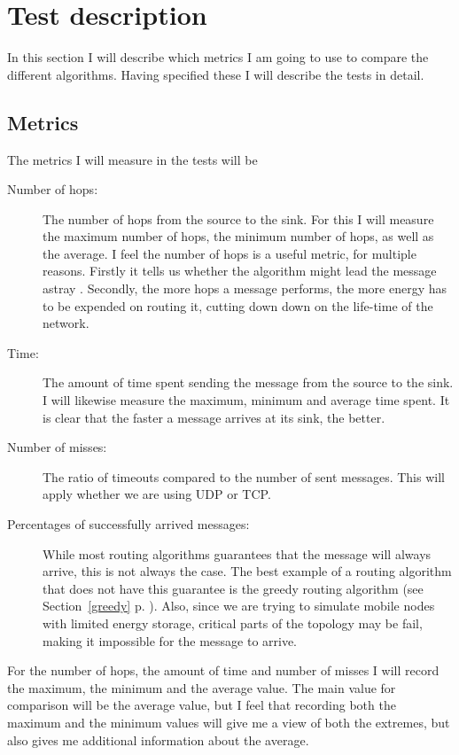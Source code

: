 \section{Test description}
In this section I will describe which metrics I am going to use to compare the different algorithms. Having specified these I will describe the tests in detail.

\subsection{Metrics}

The metrics I will measure in the tests will be 
\begin{description}
\item[Number of hops:] The number of hops from the source to the sink. For this I will measure the maximum number of hops, the minimum number of hops, as well as the average. I feel the number of hops is a useful metric, for multiple reasons. Firstly it tells us whether the algorithm might lead the message astray  . Secondly, the more hops a message performs, the more energy has to be expended on routing it, cutting down down on the life-time of the network.

\item[Time:] The amount of time spent sending the message from the source to the sink. I will likewise measure the maximum, minimum and average time spent. It is clear that the faster a message arrives at its sink, the better.

\item[Number of misses:] The ratio of timeouts compared to the number of sent messages. This will apply whether we are using UDP or TCP. 

\item[Percentages of successfully arrived messages:] While most routing algorithms guarantees that the message will always arrive, this is not always the case. The best example of a routing algorithm that does not have this guarantee is the greedy routing algorithm (see Section~\ref{greedy} p. \pageref{greedy}). Also, since we are trying to simulate mobile nodes with limited energy storage, critical parts of the topology may be fail, making it impossible for the message to arrive.
\end{description}

For the number of hops, the amount of time and number of misses I will record the maximum, the minimum and the average value. The main value for comparison will be the average value, but I feel that recording both the maximum and the minimum values will give me a view of both the extremes, but also gives me additional information about the average.

